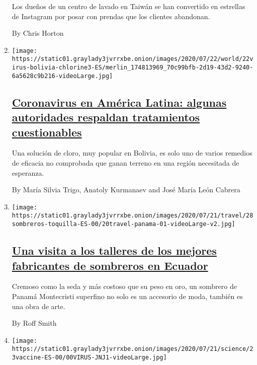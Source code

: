 \begin{enumerate}
  Los dueños de un centro de lavado en Taiwán se han convertido en
  estrellas de Instagram por posar con prendas que los clientes
  abandonan.

  By Chris Horton
\item
  \texttt{[image: https://static01.graylady3jvrrxbe.onion/images/2020/07/22/world/22virus-bolivia-chlorine3-ES/merlin\_174813969\_70c99bfb-2d19-43d2-9240-6a5628c9b216-videoLarge.jpg]}

  \hypertarget{coronavirus-en-amuxe9rica-latina-algunas-autoridades-respaldan-tratamientos-cuestionables}{%
  \subsection{\texorpdfstring{\href{/es/2020/07/23/espanol/america-latina/bolivia-cloro-coronavirus-ivermectina.html}{Coronavirus
  en América Latina: algunas autoridades respaldan tratamientos
  cuestionables}}{Coronavirus en América Latina: algunas autoridades respaldan tratamientos cuestionables}}\label{coronavirus-en-amuxe9rica-latina-algunas-autoridades-respaldan-tratamientos-cuestionables}}

  Una solución de cloro, muy popular en Bolivia, es solo uno de varios
  remedios de eficacia no comprobada que ganan terreno en una región
  necesitada de esperanza.

  By María Silvia Trigo, Anatoly Kurmanaev and José María León Cabrera
\item
  \texttt{[image: https://static01.graylady3jvrrxbe.onion/images/2020/07/21/travel/28sombreros-toquilla-ES-00/20travel-panama-01-videoLarge-v2.jpg]}

  \hypertarget{una-visita-a-los-talleres-de-los-mejores-fabricantes-de-sombreros-en-ecuador}{%
  \subsection{\texorpdfstring{\href{/es/2020/07/28/espanol/estilos-de-vida/sombreros-toquilla-panama-ecuador.html}{Una
  visita a los talleres de los mejores fabricantes de sombreros en
  Ecuador}}{Una visita a los talleres de los mejores fabricantes de sombreros en Ecuador}}\label{una-visita-a-los-talleres-de-los-mejores-fabricantes-de-sombreros-en-ecuador}}

  Cremoso como la seda y más costoso que su peso en oro, un sombrero de
  Panamá Montecristi superfino no solo es un accesorio de moda, también
  es una obra de arte.

  By Roff Smith
\item
  \texttt{[image: https://static01.graylady3jvrrxbe.onion/images/2020/07/21/science/23vaccine-ES-00/00VIRUS-JNJ1-videoLarge.jpg]}


\end{enumerate}
